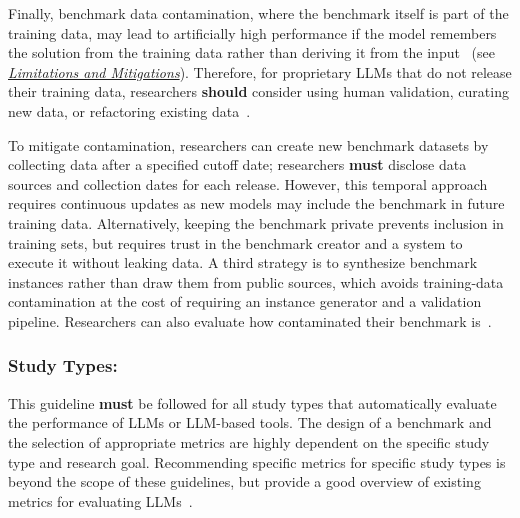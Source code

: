 \documentclass[smallextended]{svjour3}
\newcommand{\must}{\textbf{must}\xspace}
\newcommand{\should}{\textbf{should}\xspace}
\newcommand{\limitationsmitigations}{\hyperref[sec:report-limitations-and-mitigations]{\emph{Limitations and Mitigations}}\xspace}
\newcommand{\limitationsmitigations}{\href{/guidelines/limitations/}{\emph{Limitations and Mitigations}}\xspace}
\newcommand{\guidelinesubsubsection}[1]{\subsubsection{\bfseries #1:}}
\newcommand{\guidelinesubsubsection}[1]{\subsubsection{#1}}
\begin{document}
Finally, benchmark data contamination, where the benchmark itself is part of the training data, may lead to artificially high performance if the model remembers the solution from the training data rather than deriving it from the input~\cite{DBLP:journals/corr/abs-2406-04244} (see \limitationsmitigations). Therefore, for proprietary LLMs that do not release their training data, researchers \should consider using human validation, curating new data, or refactoring existing data~\cite{DBLP:journals/corr/abs-2406-04244}. 

To mitigate contamination, researchers can create new benchmark datasets by collecting data after a specified cutoff date; researchers \must disclose data sources and collection dates for each release. However, this temporal approach requires continuous updates as new models may include the benchmark in future training data. Alternatively, keeping the benchmark private prevents inclusion in training sets, but requires trust in the benchmark creator and a system to execute it without leaking data. A third strategy is to synthesize benchmark instances rather than draw them from public sources, which avoids training-data contamination at the cost of requiring an instance generator and a validation pipeline. Researchers can also evaluate how contaminated their benchmark is~\cite{DBLP:journals/corr/abs-2502-00678}.


\guidelinesubsubsection{Study Types}

This guideline \must be followed for all study types that automatically evaluate the performance of LLMs or LLM-based tools.
The design of a benchmark and the selection of appropriate metrics are highly dependent on the specific study type and research goal.
Recommending specific metrics for specific study types is beyond the scope of these guidelines, but \citeauthor{DBLP:journals/corr/abs-2505-08903} provide a good overview of existing metrics for evaluating LLMs~\cite{DBLP:journals/corr/abs-2505-08903}.
\end{document}

